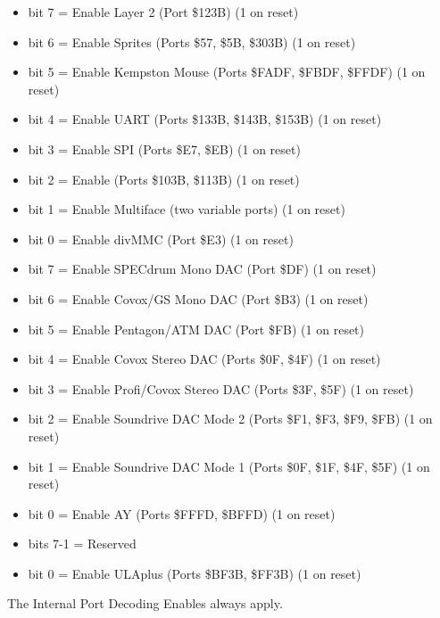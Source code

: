 \begin{itemize}
\item bit 7 = Enable Layer 2 (Port \$123B) (1 on reset)
\item bit 6 = Enable Sprites (Ports \$57, \$5B, \$303B) (1 on reset)
\item bit 5 = Enable Kempston Mouse (Ports \$FADF, \$FBDF, \$FFDF) (1
  on reset)
\item bit 4 = Enable UART (Ports \$133B, \$143B, \$153B) (1 on reset)
\item bit 3 = Enable SPI (Ports \$E7, \$EB) (1 on reset)
\item bit 2 = Enable \iic (Ports \$103B, \$113B) (1 on reset)
\item bit 1 = Enable Multiface (two variable ports) (1 on reset)
\item bit 0 = Enable divMMC (Port \$E3) (1 on reset)
\end{itemize}

\begin{itemize}
\item bit 7 = Enable SPECdrum Mono DAC (Port \$DF) (1 on reset)
\item bit 6 = Enable Covox/GS Mono DAC (Port \$B3) (1 on reset)
\item bit 5 = Enable Pentagon/ATM DAC (Port \$FB) (1 on reset)
\item bit 4 = Enable Covox Stereo DAC (Ports \$0F, \$4F) (1 on reset)
\item bit 3 = Enable Profi/Covox Stereo DAC (Ports \$3F, \$5F) (1 on
  reset)
\item bit 2 = Enable Soundrive DAC Mode 2 (Ports \$F1, \$F3, \$F9,
  \$FB) (1 on reset)
\item bit 1 = Enable Soundrive DAC Mode 1 (Ports \$0F, \$1F, \$4F,
  \$5F) (1 on reset)
\item bit 0 = Enable AY (Ports \$FFFD, \$BFFD) (1 on reset)
\end{itemize}

\begin{itemize}
\item bits 7-1 = Reserved
\item bit 0 = Enable ULAplus (Ports \$BF3B, \$FF3B) (1 on reset)
\end{itemize}

The Internal Port Decoding Enables always apply.


